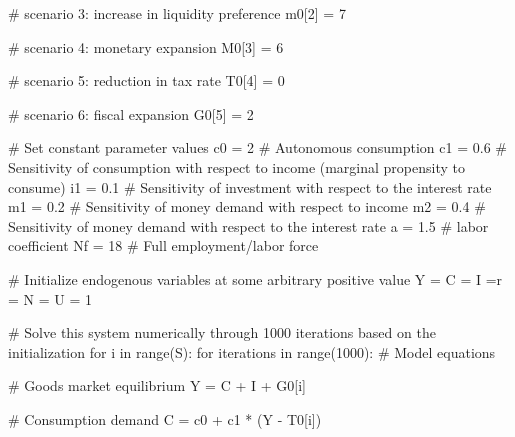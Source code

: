 \documentclass[
  letterpaper,
  DIV=11,
  numbers=noendperiod]{scrreprt}
\newenvironment{Shaded}{\begin{snugshade}}{\end{snugshade}}
\newcommand{\BuiltInTok}[1]{\textcolor[rgb]{0.00,0.23,0.31}{#1}}
\newcommand{\CommentTok}[1]{\textcolor[rgb]{0.37,0.37,0.37}{#1}}
\newcommand{\ControlFlowTok}[1]{\textcolor[rgb]{0.00,0.23,0.31}{#1}}
\newcommand{\DecValTok}[1]{\textcolor[rgb]{0.68,0.00,0.00}{#1}}
\newcommand{\FloatTok}[1]{\textcolor[rgb]{0.68,0.00,0.00}{#1}}
\newcommand{\KeywordTok}[1]{\textcolor[rgb]{0.00,0.23,0.31}{#1}}
\newcommand{\NormalTok}[1]{\textcolor[rgb]{0.00,0.23,0.31}{#1}}
\newcommand{\OperatorTok}[1]{\textcolor[rgb]{0.37,0.37,0.37}{#1}}
\begin{document}
\begin{tcolorbox}
\begin{Shaded}
\begin{Highlighting}[]
\CommentTok{\# scenario 3: increase in liquidity preference}
\NormalTok{m0[}\DecValTok{2}\NormalTok{] }\OperatorTok{=} \DecValTok{7}

\CommentTok{\# scenario 4: monetary expansion}
\NormalTok{M0[}\DecValTok{3}\NormalTok{] }\OperatorTok{=} \DecValTok{6}

\CommentTok{\# scenario 5: reduction in tax rate}
\NormalTok{T0[}\DecValTok{4}\NormalTok{] }\OperatorTok{=} \DecValTok{0}

\CommentTok{\# scenario 6: fiscal expansion}
\NormalTok{G0[}\DecValTok{5}\NormalTok{] }\OperatorTok{=} \DecValTok{2}

\CommentTok{\# Set constant parameter values}
\NormalTok{c0 }\OperatorTok{=} \DecValTok{2}  \CommentTok{\# Autonomous consumption}
\NormalTok{c1 }\OperatorTok{=} \FloatTok{0.6}  \CommentTok{\# Sensitivity of consumption with respect to income (marginal propensity to consume)}
\NormalTok{i1 }\OperatorTok{=} \FloatTok{0.1}  \CommentTok{\# Sensitivity of investment with respect to the interest rate}
\NormalTok{m1 }\OperatorTok{=} \FloatTok{0.2}  \CommentTok{\# Sensitivity of money demand with respect to income}
\NormalTok{m2 }\OperatorTok{=} \FloatTok{0.4}  \CommentTok{\# Sensitivity of money demand with respect to the interest rate}
\NormalTok{a }\OperatorTok{=} \FloatTok{1.5}  \CommentTok{\# labor coefficient}
\NormalTok{Nf }\OperatorTok{=} \DecValTok{18}  \CommentTok{\# Full employment/labor force}

\CommentTok{\# Initialize endogenous variables at some arbitrary positive value}
\NormalTok{Y }\OperatorTok{=}\NormalTok{ C }\OperatorTok{=}\NormalTok{ I }\OperatorTok{=}\NormalTok{r }\OperatorTok{=}\NormalTok{ N }\OperatorTok{=}\NormalTok{ U }\OperatorTok{=} \DecValTok{1}

\CommentTok{\# Solve this system numerically through 1000 iterations based on the initialization}
\ControlFlowTok{for}\NormalTok{ i }\KeywordTok{in} \BuiltInTok{range}\NormalTok{(S):}
    \ControlFlowTok{for}\NormalTok{ iterations }\KeywordTok{in} \BuiltInTok{range}\NormalTok{(}\DecValTok{1000}\NormalTok{):}
        \CommentTok{\# Model equations}

        \CommentTok{\# Goods market equilibrium}
\NormalTok{        Y }\OperatorTok{=}\NormalTok{ C }\OperatorTok{+}\NormalTok{ I }\OperatorTok{+}\NormalTok{ G0[i]}

        \CommentTok{\# Consumption demand}
\NormalTok{        C }\OperatorTok{=}\NormalTok{ c0 }\OperatorTok{+}\NormalTok{ c1 }\OperatorTok{*}\NormalTok{ (Y }\OperatorTok{{-}}\NormalTok{ T0[i])}


\end{Highlighting}
\end{Shaded}
\end{tcolorbox}
\end{document}

